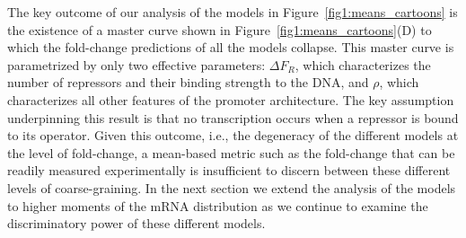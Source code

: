 The key outcome of our analysis of the models in
Figure~\ref{fig1:means_cartoons} is the existence of a master curve shown
in Figure~\ref{fig1:means_cartoons}(D) to which the fold-change predictions
of all the models collapse. This master curve is parametrized by only two
effective parameters: $\Delta F_R$, which characterizes the number of repressors
and their binding strength to the DNA, and $\rho$, which characterizes all other
features of the promoter architecture. The key assumption underpinning this
result is that no transcription occurs when a repressor is bound to its
operator. Given this outcome, i.e., the degeneracy of the different models at
the level of fold-change, a mean-based metric such as the fold-change that can
be readily measured experimentally is insufficient to discern between these
different levels of coarse-graining. In the next section we extend the analysis
of the models to higher moments of the mRNA distribution as we continue to
examine the discriminatory power of these different models.









